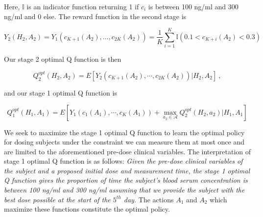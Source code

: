 \noindent Here, $ \mathbb{I} $ is an indicator function returning 1 if $c_i$ is between 100 ng/ml and 300 ng/ml and 0 else.
%
\noindent The reward function in the second stage is

\begin{equation}
Y_2(H_2, A_2) = Y_1(c_{K+1}(A_2), \dots, c_{2K}(A_2)) = \dfrac{1}{K}\sum_{i=1}^K \mathbb{I}(0.1 < c_{K+i}(A_2) < 0.3)
\end{equation}



Our stage 2 optimal Q function is then

\begin{equation}
Q_{2}^{o p t}\left(H_{2}, A_{2}\right)=E\left[Y_2\left(c_{K+1}(A_2), \cdots, c_{2K}(A_2)\right) \Bigg\vert H_{2}, A_{2}\right] \>,
\end{equation}

\noindent and our stage 1 optimal Q function is

\begin{equation}
Q_{1}^{o p t}\left(H_{1}, A_{1}\right)= E \left[Y_1\left(c_{1}(A_1),  \cdots, c_{K}(A_1)\right)+\max _{a_{2} \in \mathscr{A}} Q_{2}^{o p t}\left(H_{2}, a_{2}\right) \Bigg\vert H_{1}, A_{1}\right]
\end{equation}

We seek to maximize the stage 1 optimal Q function to learn the optimal policy for dosing subjects under the constraint we can measure them at most once and are limited to the aforementioned pre-dose clinical variables.  The interpretation of stage 1 optimal Q function is as follows:\textit{ Given the pre-dose clinical variables of the subject and a proposed initial dose and measurement time, the stage 1 optimal Q function gives the proportion of time the subject’s blood serum concentration is between 100 ng/ml and 300 ng/ml assuming that we provide the subject with the best dose possible at the start of the $ 5^{th} $ day.}  The actions $ A_1 $ and $ A_2 $ which maximize these functions constitute the optimal policy.


